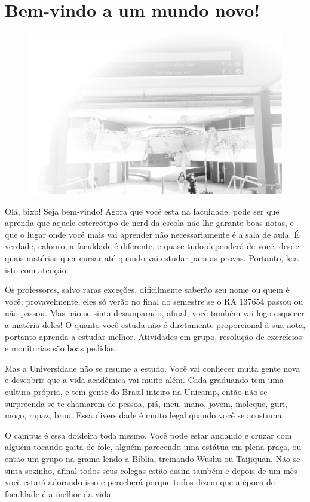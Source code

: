 
\section{Bem-vindo a um mundo novo!}

\begin{figure}
    \includegraphics[width=.5\textwidth]{img/imgs/1-boas_vindas/-007.jpg}
\end{figure}

Olá, bixo! Seja bem-vindo! Agora que você está na faculdade, pode ser que
aprenda que aquele estereótipo de nerd da escola não lhe garante boas notas, e
que o lugar onde você mais vai aprender não necessariamente é a sala de aula. É
verdade, calouro, a faculdade é diferente, e quase tudo dependerá de você, desde
quais matérias quer cursar até quando vai estudar para as provas. Portanto, leia
isto com atenção.

Os professores, salvo raras exceções, dificilmente saberão seu nome ou quem é
você; provavelmente, eles só verão no final do semestre se o RA 137654  passou
ou não passou. Mas não se sinta desamparado, afinal, você também vai logo
esquecer a matéria deles! O quanto você estuda não é diretamente proporcional à
sua nota, portanto aprenda a estudar melhor. Atividades em grupo, resolução de
exercícios e monitorias são boas pedidas.

Mas a Universidade não se resume a estudo. Você vai conhecer muita gente nova e
descobrir que a vida acadêmica vai muito além.  Cada graduando tem uma cultura
própria, e tem gente do Brasil inteiro na Unicamp, então não se surpreenda se te
chamarem de pessoa, piá, meu, mano, jovem, moleque, guri, moço, rapaz, brou.
Essa diversidade é muito legal quando você se acostuma.

O campus é essa doideira toda mesmo. Você pode estar andando e cruzar com alguém
tocando gaita de fole, alguém parecendo uma estátua em plena praça, ou então um
grupo na grama lendo a Bíblia, treinando Wushu ou Taijiquan. Não se sinta
sozinho, afinal todos seus colegas estão assim também e depois de um mês você
estará adorando isso e perceberá porque todos dizem que a época de faculdade é a
melhor da vida.

